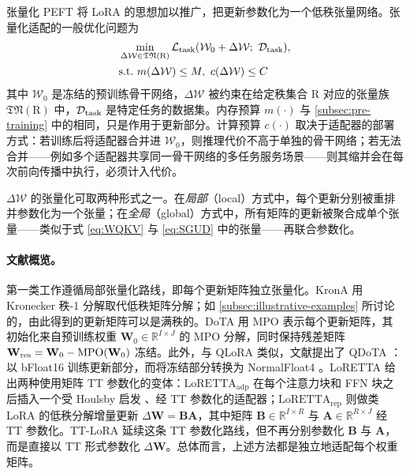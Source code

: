 \documentclass[11pt]{article}
\newcommand{\R}{\mathbb{R}}
\newcommand{\ten}[1]{\mathcal{#1}}
\newcommand{\mat}[1]{\mathbf{#1}}
\newcommand{\set}[1]{\mathrm{#1}}
\begin{document}
张量化 PEFT 将 LoRA \cite{hu2022lora} 的思想加以推广，把更新参数化为一个低秩张量网络。张量化适配的一般优化问题为
\begin{equation}
\begin{aligned}
& \min_{\Delta \ten{W} \in \mathfrak{TN}(\set{R})} \mathcal{L}_{\rm task}(\ten{W}_0 + \Delta \ten{W}; \ \mathcal{D}_{\rm task}), \\
& {\rm s.t.} ~ m(\Delta \ten{W}) \leq M,\ c(\Delta \ten{W}) \leq C
\end{aligned}
\end{equation}
其中 $\ten{W}_0$ 是冻结的预训练骨干网络，$\Delta \ten{W}$ 被约束在给定秩集合 $\set{R}$ 对应的张量族 $\mathfrak{TN}(\set{R})$ 中，$\mathcal{D}_{\rm task}$ 是特定任务的数据集。内存预算 $m(\cdot)$ 与 \cref{subsec:pre-training} 中的相同，只是作用于更新部分。计算预算 $c(\cdot)$ 取决于适配器的部署方式：若训练后将适配器合并进 $\ten{W}_0$，则推理代价不高于单独的骨干网络；若无法合并——例如多个适配器共享同一骨干网络的多任务服务场景——则其缩并会在每次前向传播中执行，必须计入代价。

$\Delta \ten{W}$ 的张量化可取两种形式之一。在\emph{局部}（local）方式中，每个更新分别被重排并参数化为一个张量；在\emph{全局}（global）方式中，所有矩阵的更新被聚合成单个张量——类似于式 \eqref{eq:WQKV} 与 \eqref{eq:SGUD} 中的张量——再联合参数化。

\paragraph{文献概览。}

第一类工作遵循局部张量化路线，即每个更新矩阵独立张量化。KronA \cite{edalati2022krona} 用 Kronecker 秩-1 分解取代低秩矩阵分解；如 \cref{subsec:illustrative-examples} 所讨论的，由此得到的更新矩阵可以是满秩的。DoTA \cite{hu2024dota} 用 MPO 表示每个更新矩阵，其初始化来自预训练权重 $\mat{W}_0 \in \R^{I \times J}$ 的 MPO 分解，同时保持残差矩阵 $\mat{W}_{\rm res} = \mat{W}_0 - \operatorname{MPO}(\mat{W}_0)$ 冻结。此外，与 QLoRA \cite{dettmers2023qlora} 类似，文献提出了 QDoTA \cite{hu2024dota}：以 bFloat16 训练更新部分，而将冻结部分转换为 NormalFloat4 \cite{dettmers2023qlora}。LoRETTA \cite{yang2024loretta} 给出两种使用矩阵 TT 参数化的变体：$\text{LoRETTA}_{\text{adp}}$ 在每个注意力块和 FFN 块之后插入一个受 Houlsby 启发 \cite{houlsby2019adapters}、经 TT 参数化的适配器；$\text{LoRETTA}_{\text{rep}}$ 则做类 LoRA 的低秩分解增量更新 $\Delta \mat{W} = \mat{B}\mat{A}$，其中矩阵 $\mat{B} \in \R^{I \times R}$ 与 $\mat{A} \in \R^{R \times J}$ 经 TT 参数化。TT-LoRA \cite{anjum2024ttlora} 延续这条 TT 参数化路线，但不再分别参数化 $\mat{B}$ 与 $\mat{A}$，而是直接以 TT 形式参数化 $\Delta \mat{W}$。总体而言，上述方法都是独立地适配每个权重矩阵。
\end{document}
